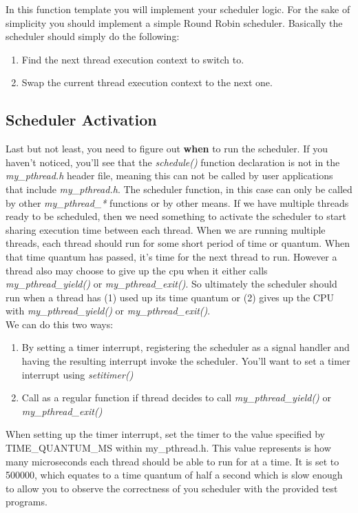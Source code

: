 \documentclass{article}
\begin{document}
\noindent In this function template you will implement your scheduler logic. For the sake of simplicity you should implement a simple Round Robin scheduler. Basically the scheduler should simply do the following:
\begin{enumerate}
\item Find the next thread execution context to switch to.
\item Swap the current thread execution context to the next one.
\end{enumerate}



\subsection{Scheduler Activation}
Last but not least, you need to figure out \textbf{when} to run the scheduler. If you haven’t noticed, you’ll see that the \textit{schedule()} function declaration is not in the \textit{my\_pthread.h} header file, meaning this can not be called by user applications that include \textit{my\_pthread.h}. The scheduler function, in this case can only be called by other \textit{my\_pthread\_*} functions or by other means. If we have multiple threads ready to be scheduled, then we need something to activate the scheduler to start sharing execution time between each thread. When we are running multiple threads, each thread should run for some short period of time or quantum. When that time quantum has passed, it’s time for the next thread to run. However a thread also may choose to give up the cpu when it either calls \textit{my\_pthread\_yield()} or \textit{my\_pthread\_exit()}. So ultimately the scheduler should run when a thread has (1) used up its time quantum or (2) gives up the CPU with \textit{my\_pthread\_yield()} or \textit{my\_pthread\_exit()}.\\

We can do this two ways:
\begin{enumerate}
\item By setting a timer interrupt, registering the scheduler as a signal handler and having the resulting interrupt invoke the scheduler. You’ll want to set a timer interrupt using \textit{setitimer()}
\item Call as a regular function if thread decides to call \textit{my\_pthread\_yield()} or \textit{my\_pthread\_exit()}
\end{enumerate}

\noindent When setting up the timer interrupt, set the timer to the value specified by TIME\_QUANTUM\_MS within my\_pthread.h. This value represents is how many microseconds each thread should be able to run for at a time. It is set to 500000, which equates to a time quantum of half a second which is slow enough to allow you to observe the correctness of you scheduler with the provided test programs.\\
\end{document}
